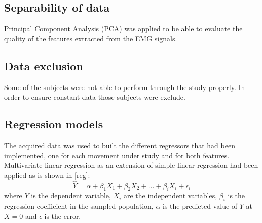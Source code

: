 \documentclass[a4paper, 10pt, conference]{ieeeconf}      %
\begin{document}
	\subsection{Separability of data}
Principal Component Analysis (PCA) was applied to be able to evaluate the quality of the features extracted from the EMG signals.
	\subsection{Data exclusion}
	Some of the subjects were not able to perform through the study properly. In order to ensure constant data those subjects were exclude.
	\subsection{Regression models}
	The acquired data was used to built the different regressors that had been implemented, one for each movement under study and for both features. Multivariate linear regression as an extension of simple linear regression had been applied as is shown in \ref{reg}:
\begin{equation}
	\hat{Y} = \alpha + \beta_1 X_{1} + \beta_2 X_{2} + ... + \beta_i X_{i} + \epsilon_i
		\label{reg}
\end{equation}
	where $Y$ is the dependent variable, $X_i$ are the independent variables, $\beta_i$ is the regression coefficient in the sampled population, $\alpha$ is the predicted value of $Y$ at $X = 0$ and $\epsilon$ is the error.
	
\end{document}
